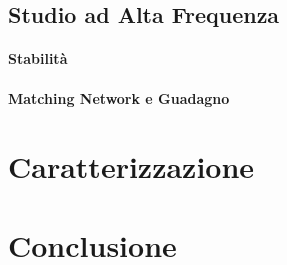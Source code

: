 \documentclass[12pt]{article}
\begin{document}
\subsection{Studio ad Alta Frequenza}
\paragraph{Stabilità}
\paragraph{Matching Network e Guadagno}



\section{Caratterizzazione}

\section{Conclusione}
\end{document}
